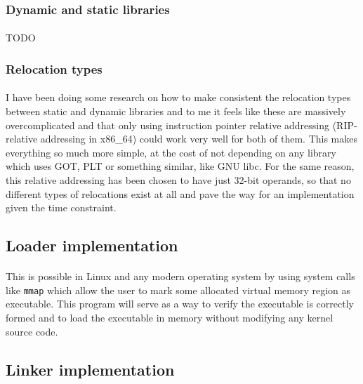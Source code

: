 \documentclass[12pt]{article}
\begin{document}
	\subsubsection{Dynamic and static libraries}
	
	\paragraph{}TODO
	
	\subsubsection{Relocation types}
	
	\paragraph{}I have been doing some research on how to make consistent the relocation types between static and dynamic libraries and to me it feels like these are massively overcomplicated and that only using instruction pointer relative addressing (RIP-relative addressing in x86\_64) could work very well for both of them. This makes everything so much more simple, at the cost of not depending on any library which uses GOT, PLT or something similar, like GNU libc. For the same reason, this relative addressing has been chosen to have just 32-bit operands, so that no different types of relocations exist at all and pave the way for an implementation given the time constraint.
	
	\subsection{Loader implementation}
	
	\paragraph{}This is possible in Linux and any modern operating system by using system calls like \verb|mmap| which allow the user to mark some allocated virtual memory region as executable. This program will serve as a way to verify the executable is correctly formed and to load the executable in memory without modifying any kernel source code.
	
	\subsection{Linker implementation}
	
\end{document}
